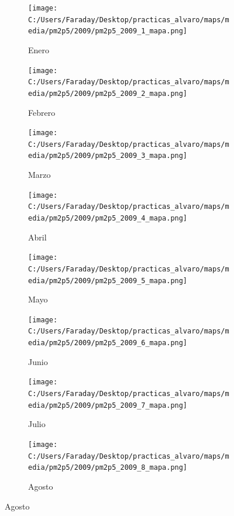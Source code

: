 \documentclass[12pt]{beamer}
\begin{document}
\begin{frame}[squeeze]
\tiny
\begin{figure}[H]
\centering
\begin{subfigure}[H]{0.20\textwidth}
\texttt{[image: C:/Users/Faraday/Desktop/practicas\_alvaro/maps/media/pm2p5/2009/pm2p5\_2009\_1\_mapa.png]}
\captionsetup{labelformat=empty}
\caption{\scriptsize Enero}
\label{fig:map-pm2p5-2009-1}
\end{subfigure}
%
\begin{subfigure}[H]{0.20\textwidth}
\texttt{[image: C:/Users/Faraday/Desktop/practicas\_alvaro/maps/media/pm2p5/2009/pm2p5\_2009\_2\_mapa.png]}
\captionsetup{labelformat=empty}
\caption{\scriptsize Febrero}
\label{fig:map-pm2p5-2009-2}
\end{subfigure}
%
\begin{subfigure}[H]{0.20\textwidth}
\texttt{[image: C:/Users/Faraday/Desktop/practicas\_alvaro/maps/media/pm2p5/2009/pm2p5\_2009\_3\_mapa.png]}
\captionsetup{labelformat=empty}
\caption{\scriptsize Marzo}
\label{fig:map-pm2p5-2009-3}
\end{subfigure}
%
\begin{subfigure}[H]{0.20\textwidth}
\texttt{[image: C:/Users/Faraday/Desktop/practicas\_alvaro/maps/media/pm2p5/2009/pm2p5\_2009\_4\_mapa.png]}
\captionsetup{labelformat=empty}
\caption{\scriptsize Abril}
\label{fig:map-pm2p5-2009-4}
\end{subfigure}

\begin{subfigure}[H]{0.20\textwidth}
\texttt{[image: C:/Users/Faraday/Desktop/practicas\_alvaro/maps/media/pm2p5/2009/pm2p5\_2009\_5\_mapa.png]}
\captionsetup{labelformat=empty}
\caption{\scriptsize Mayo}
\label{fig:map-pm2p5-2009-5}
\end{subfigure}
%
\begin{subfigure}[H]{0.20\textwidth}
\texttt{[image: C:/Users/Faraday/Desktop/practicas\_alvaro/maps/media/pm2p5/2009/pm2p5\_2009\_6\_mapa.png]}
\captionsetup{labelformat=empty}
\caption{\scriptsize Junio}
\label{fig:map-pm2p5-2009-6}
\end{subfigure}
%
\begin{subfigure}[H]{0.20\textwidth}
\texttt{[image: C:/Users/Faraday/Desktop/practicas\_alvaro/maps/media/pm2p5/2009/pm2p5\_2009\_7\_mapa.png]}
\captionsetup{labelformat=empty}
\caption{\scriptsize Julio}
\label{fig:map-pm2p5-2009-7}
\end{subfigure}
%
\begin{subfigure}[H]{0.20\textwidth}
\texttt{[image: C:/Users/Faraday/Desktop/practicas\_alvaro/maps/media/pm2p5/2009/pm2p5\_2009\_8\_mapa.png]}
\captionsetup{labelformat=empty}
\caption{\scriptsize Agosto}
\label{fig:map-pm2p5-2009-8}
\end{subfigure}


\end{figure}
\end{frame}
\end{document}
